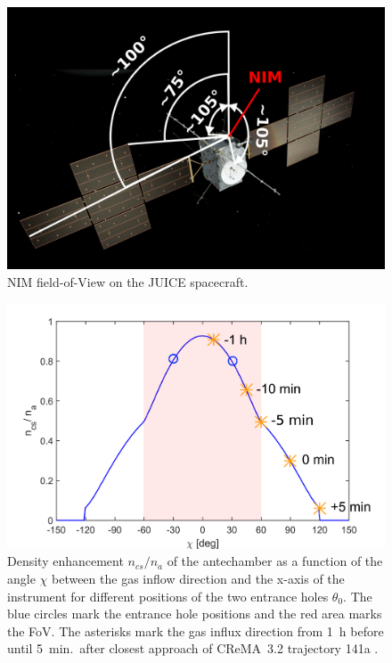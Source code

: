 	\begin{figure}[h!]
		\centering
		\includegraphics[width=.6\textwidth]{Bilder/SC_Angle.png}
		\caption{NIM field-of-View on the JUICE spacecraft.}
		\label{fig:SCFoV}
	\end{figure}
	\begin{figure}[h!]
		\centering
		\includegraphics[width=.8\textwidth]{Bilder/Chi_theta0_flyby.png}
		\caption{Density enhancement $n_{cs}/n_a$ of the antechamber as a function of the angle $\chi$ between the gas inflow direction and the x-axis of the instrument for different positions of the two entrance holes $\theta_0$. The blue circles mark the entrance hole positions and the red area marks the FoV. The asterisks mark the gas influx direction from 1~h before until 5~min.\ after closest approach of CReMA~3.2 trajectory 141a \cite{SOC_Crema3p2}.}
		\label{fig:densEnhChiFlyby}
	\end{figure}
